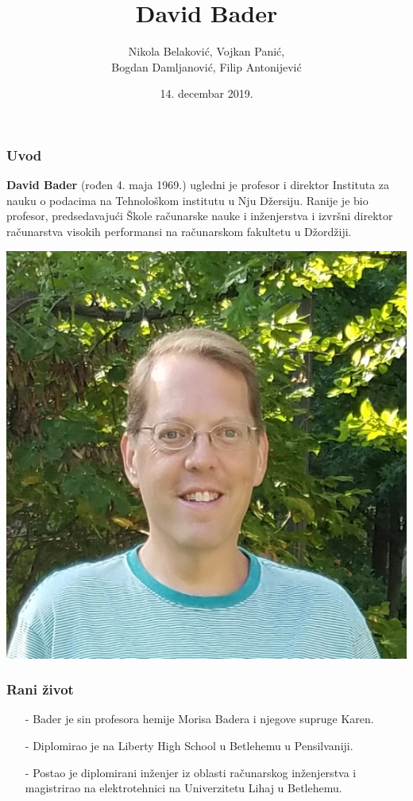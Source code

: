 \documentclass{beamer}
\institute{\texttt{[image: matf-logo.eps]}}
\date{\tiny{14. decembar 2019.}}
\title{\textbf{David Bader}}
\author{\small{Nikola Belaković, Vojkan Panić,\\Bogdan Damljanović, Filip Antonijević}}
\begin{document}
\frame{\titlepage}



\begin{frame}
\frametitle{Uvod}
\textbf{David Bader} (rođen 4. maja 1969.) ugledni je profesor i direktor Instituta za nauku o podacima na Tehnološkom institutu u Nju Džersiju. Ranije je bio profesor, predsedavajući Škole računarske nauke i inženjerstva i izvršni direktor računarstva visokih performansi na računarskom fakultetu u Džordžiji.  
\begin{center}
\includegraphics[scale=0.3]{David_Bader_2017.png}
\end{center}
\end{frame}


\begin{frame}
\frametitle{Rani život}
\begin{itemize}
\item [-] Bader je sin profesora hemije Morisa Badera i njegove supruge Karen.
\item [-] Diplomirao je na Liberty High School u Betlehemu u Pensilvaniji.
\item [-] Postao je diplomirani inženjer iz oblasti računarskog inženjerstva i magistrirao na elektrotehnici na Univerzitetu Lihaj u Betlehemu.
\end{itemize}
\end{frame}
\end{document}
